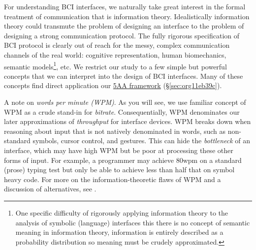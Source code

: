 \documentclass[logo,bsc,singlespacing,parskip]{infthesis}
\begin{document}
For understanding BCI interfaces, we naturally take great interest in the formal treatment of communication that is information theory.
Idealistically information theory could transmute the problem of designing an interface to the problem of designing a strong communication protocol.
The fully rigorous specification of BCI protocol is clearly out of reach for the messy, complex communication channels of the real world: cognitive representation, human biomechanics, semantic models\footnote{One specific difficulty of rigorously applying information theory to the analysis of symbolic (language) interfaces this there is no concept of semantic meaning in information theory, information is entirely described as a probability distribution so meaning must be crudely approximated.}, etc.
We restrict our study to a few simple but powerful concepts that we can interpret into the design of BCI interfaces.
Many of these concepts find direct application our \hyperref[sec:org11eb39c]{5AA framework} (\S \ref{sec:org11eb39c}).

A note on \emph{words per minute (WPM)}.
As you will see, we use familiar concept of WPM as a crude stand-in for \emph{bitrate}.
Consequentially, WPM denominates our later approximations of \emph{throughput} for interface devices.
WPM breaks down when reasoning about input that is not natively denominated in words, such as non-standard symbols, cursor control, and gestures.
This can hide the \emph{bottleneck} of an interface, which may have high WPM but be poor at processing these other forms of input.
For example, a programmer may achieve 80wpm on a standard (prose) typing test but only be able to achieve less than half that on symbol heavy code.
For more on the information-theoretic flaws of WPM and a discussion of alternatives, see \autocite[pp. 57]{liuInformationTheoryUnified}.
\end{document}
